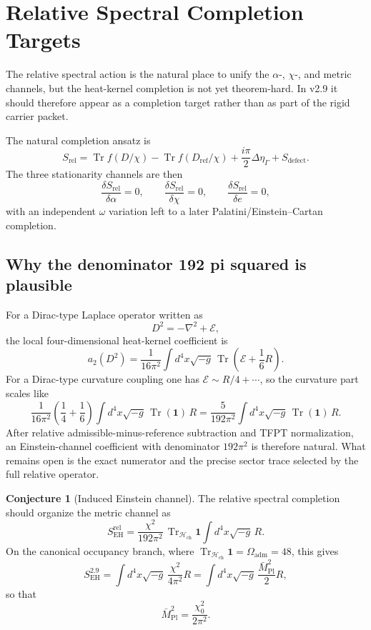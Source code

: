 \documentclass[11pt,a4paper]{article}
\theoremstyle{definition}
\newtheorem{conjecture}[theorem]{Conjecture}
\theoremstyle{remark}
\newcommand{\Mpl}{\bar M_{\mathrm{Pl}}}
\newcommand{\tr}{\operatorname{Tr}}
\newcommand{\Hch}{\mathcal H_{\mathrm{ch}}}
\newcommand{\Oadm}{\Omega_{\mathrm{adm}}}
\begin{document}
\section{Relative Spectral Completion Targets}

\begin{tcolorbox}[colback=gray!5, colframe=gray!60, breakable,
    title={\textbf{Status: dynamical target, not part of the hard carrier core}}, fonttitle=\bfseries]
The relative spectral action is the natural place to unify the $\alpha$-, $\chi$-, and metric channels, but the heat-kernel completion is not yet theorem-hard. In v2.9 it should therefore appear as a completion target rather than as part of the rigid carrier packet.
\end{tcolorbox}

The natural completion ansatz is
\[
S_{\mathrm{rel}}
= \tr f(D/\chi)
- \tr f(D_{\mathrm{ref}}/\chi)
+ \frac{i\pi}{2}\Delta\eta_\Gamma
+ S_{\mathrm{defect}}.
\]
The three stationarity channels are then
\[
\frac{\delta S_{\mathrm{rel}}}{\delta\alpha}=0,
\qquad
\frac{\delta S_{\mathrm{rel}}}{\delta\chi}=0,
\qquad
\frac{\delta S_{\mathrm{rel}}}{\delta e}=0,
\]
with an independent $\omega$ variation left to a later Palatini/Einstein--Cartan completion.

\subsection{Why the denominator 192 pi squared is plausible}

For a Dirac-type Laplace operator written as
\[
D^2=-\nabla^2+\mathcal E,
\]
the local four-dimensional heat-kernel coefficient is
\[
a_2(D^2)=\frac{1}{16\pi^2}\int d^4x\sqrt{-g}\,
\tr\!\left(\mathcal E+\frac16 R\right).
\]
For a Dirac-type curvature coupling one has $\mathcal E\sim R/4+\cdots$, so the curvature part scales like
\[
\frac{1}{16\pi^2}\left(\frac14+\frac16\right)
\int d^4x\sqrt{-g}\,\tr(\mathbf 1)\,R
=
\frac{5}{192\pi^2}
\int d^4x\sqrt{-g}\,\tr(\mathbf 1)\,R.
\]
After relative admissible-minus-reference subtraction and TFPT normalization, an Einstein-channel coefficient with denominator $192\pi^2$ is therefore natural. What remains open is the exact numerator and the precise sector trace selected by the full relative operator.

\begin{conjecture}[Induced Einstein channel]
The relative spectral completion should organize the metric channel as
\[
S_{\mathrm{EH}}^{\mathrm{rel}}
=
\frac{\chi^2}{192\pi^2}\,\tr_{\Hch}\mathbf 1
\int d^4x\sqrt{-g}\,R.
\]
On the canonical occupancy branch, where $\tr_{\Hch}\mathbf 1=\Oadm=48$, this gives
\[
S_{\mathrm{EH}}^{2.9}
= \int d^4x\sqrt{-g}\,\frac{\chi^2}{4\pi^2}R
= \int d^4x\sqrt{-g}\,\frac{\Mpl^2}{2}R,
\]
so that
\[
\Mpl^2=\frac{\chi_0^2}{2\pi^2}.
\]
\end{conjecture}
\end{document}
